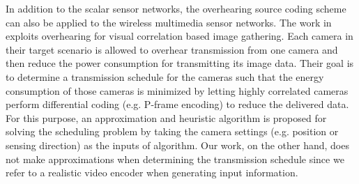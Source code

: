 %

In addition to the scalar sensor networks, the overhearing source coding scheme can also be applied to the wireless multimedia sensor networks.
The work in~\cite{imageModelCluster} exploits overhearing for visual correlation based image gathering.
Each camera in their target scenario is allowed to overhear transmission from one camera and then reduce the power consumption for transmitting its image data.
Their goal is to determine a transmission schedule for the cameras such that the energy consumption of those cameras is minimized by letting highly correlated cameras perform differential coding (e.g. P-frame encoding) to reduce the delivered data.
For this purpose, an approximation and heuristic algorithm is proposed for solving the scheduling problem by taking the camera settings (e.g. position or sensing direction) as the inputs of algorithm.
Our work, on the other hand, does not make approximations when determining the transmission schedule since we refer to a realistic video encoder when generating input information.
%